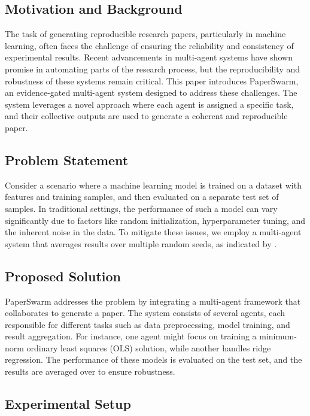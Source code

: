 \subsection{Motivation and Background}

The task of generating reproducible research papers, particularly in machine learning, often faces the challenge of ensuring the reliability and consistency of experimental results. Recent advancements in multi-agent systems have shown promise in automating parts of the research process, but the reproducibility and robustness of these systems remain critical. This paper introduces PaperSwarm, an evidence-gated multi-agent system designed to address these challenges. The system leverages a novel approach where each agent is assigned a specific task, and their collective outputs are used to generate a coherent and reproducible paper.

\subsection{Problem Statement}

Consider a scenario where a machine learning model is trained on a dataset with  features and  training samples, and then evaluated on a separate test set of  samples. In traditional settings, the performance of such a model can vary significantly due to factors like random initialization, hyperparameter tuning, and the inherent noise in the data. To mitigate these issues, we employ a multi-agent system that averages results over multiple random seeds, as indicated by .

\subsection{Proposed Solution}

PaperSwarm addresses the problem by integrating a multi-agent framework that collaborates to generate a paper. The system consists of several agents, each responsible for different tasks such as data preprocessing, model training, and result aggregation. For instance, one agent might focus on training a minimum-norm ordinary least squares (OLS) solution, while another handles ridge regression. The performance of these models is evaluated on the test set, and the results are averaged over  to ensure robustness.

\subsection{Experimental Setup}

